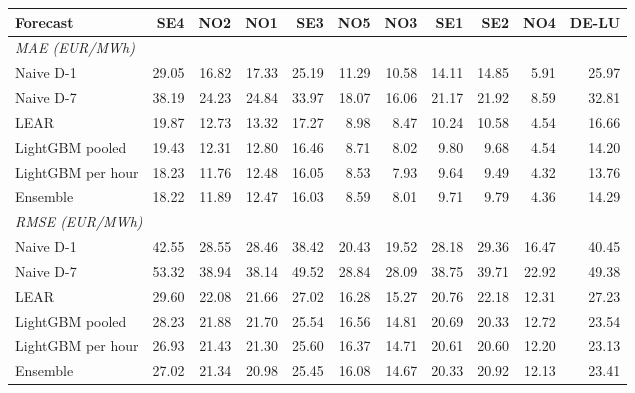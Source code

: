 \begin{tabular}{lrrrrrrrrrr}
\toprule
Forecast & SE4 & NO2 & NO1 & SE3 & NO5 & NO3 & SE1 & SE2 & NO4 & DE-LU \\
\midrule
\multicolumn{11}{l}{\textit{MAE (EUR/MWh)}} \\
Naive D-1 & 29.05 & 16.82 & 17.33 & 25.19 & 11.29 & 10.58 & 14.11 & 14.85 & 5.91 & 25.97 \\
Naive D-7 & 38.19 & 24.23 & 24.84 & 33.97 & 18.07 & 16.06 & 21.17 & 21.92 & 8.59 & 32.81 \\
LEAR & 19.87 & 12.73 & 13.32 & 17.27 & 8.98 & 8.47 & 10.24 & 10.58 & 4.54 & 16.66 \\
LightGBM pooled & 19.43 & 12.31 & 12.80 & 16.46 & 8.71 & 8.02 & 9.80 & 9.68 & 4.54 & 14.20 \\
LightGBM per hour & 18.23 & 11.76 & 12.48 & 16.05 & 8.53 & 7.93 & 9.64 & 9.49 & 4.32 & 13.76 \\
Ensemble & 18.22 & 11.89 & 12.47 & 16.03 & 8.59 & 8.01 & 9.71 & 9.79 & 4.36 & 14.29 \\
\midrule
\multicolumn{11}{l}{\textit{RMSE (EUR/MWh)}} \\
Naive D-1 & 42.55 & 28.55 & 28.46 & 38.42 & 20.43 & 19.52 & 28.18 & 29.36 & 16.47 & 40.45 \\
Naive D-7 & 53.32 & 38.94 & 38.14 & 49.52 & 28.84 & 28.09 & 38.75 & 39.71 & 22.92 & 49.38 \\
LEAR & 29.60 & 22.08 & 21.66 & 27.02 & 16.28 & 15.27 & 20.76 & 22.18 & 12.31 & 27.23 \\
LightGBM pooled & 28.23 & 21.88 & 21.70 & 25.54 & 16.56 & 14.81 & 20.69 & 20.33 & 12.72 & 23.54 \\
LightGBM per hour & 26.93 & 21.43 & 21.30 & 25.60 & 16.37 & 14.71 & 20.61 & 20.60 & 12.20 & 23.13 \\
Ensemble & 27.02 & 21.34 & 20.98 & 25.45 & 16.08 & 14.67 & 20.33 & 20.92 & 12.13 & 23.41 \\
\bottomrule
\end{tabular}
